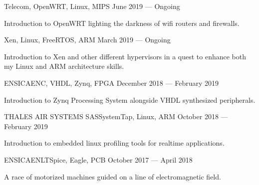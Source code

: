 
        {}{Telecom, OpenWRT, Linux, MIPS}
        {June 2019 --- Ongoing}
        {
            \begin{additems}
                \item Introduction to OpenWRT lighting the darkness of wifi routers and firewalls.
            \end{additems}
        }

        {}{Xen, Linux, FreeRTOS, ARM}
        {March 2019 --- Ongoing}
        {
            \begin{additems}
                \item Introduction to Xen and other different hypervisors in a quest to enhance both my Linux and ARM architecture skills.
            \end{additems}
        }

        {ENSICAEN}{C, VHDL, Zynq, FPGA}
        {December 2018 --- February 2019}
        {
            \begin{additems}
                \item Introduction to Zynq Processing System alongside VHDL synthesized peripherals.
            \end{additems}
        }

        {THALES AIR SYSTEMS SAS}{SystemTap, Linux, ARM}
        {October 2018 --- February 2019}
        {
            \begin{additems}
                \item Introduction to embedded linux profiling tools for realtime applications.
            \end{additems}
        }

        {ENSICAEN}{LTSpice, Eagle, PCB}
        {October 2017 --- April 2018}
        {
            \begin{additems}
                \item A race of motorized machines guided on a line of electromagnetic field.
            \end{additems}
        }
